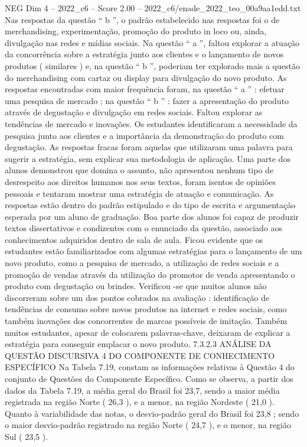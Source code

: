 \begin{textsample}{NEG Dim 4 – 2022\_c6 – Score 2.00 – 2022\_c6/enade\_2022\_teo\_00a9aa1edd.txt}
Nas respostas da questão “ b ”, o padrão estabelecido nas respostas foi o de merchandising, experimentação, promoção do produto in loco ou, ainda, divulgação nas redes e mídias sociais.
Na questão “ a ”, faltou explorar a atuação da concorrência sobre a estratégia junto aos clientes e o lançamento de novos produtos ( similares ) e, na questão “ b ”, poderiam ter explorado mais a questão do merchandising com cartaz ou display para divulgação do novo produto.
As respostas encontradas com maior frequência foram, na questão “ a ” : efetuar uma pesquisa de mercado ; na questão “ b ” : fazer a apresentação do produto através de degustação e divulgação em redes sociais.
Faltou explorar as tendências de mercado e inovações.
Os estudantes identificaram a necessidade da pesquisa junto aos clientes e a importância da demonstração do produto com degustação.
As respostas fracas foram aquelas que utilizaram uma palavra para sugerir a estratégia, sem explicar sua metodologia de aplicação.
Uma parte dos alunos demonstrou que domina o assunto, não apresentou nenhum tipo de desrespeito aos direitos humanos nos seus textos, foram isentos de opiniões pessoais e tentaram mostrar uma estratégia de atuação e comunicação.
As respostas estão dentro do padrão estipulado e do tipo de escrita e argumentação esperada por um aluno de graduação.
Boa parte dos alunos foi capaz de produzir textos dissertativos e condizentes com o enunciado da questão, associado aos conhecimentos adquiridos dentro de sala de aula.
Ficou evidente que os estudantes estão familiarizados com algumas estratégias para o lançamento de um novo produto, como a pesquisa de mercado, a utilização de redes sociais e a promoção de vendas através da utilização do promotor de venda apresentando o produto com degustação ou brindes.
Verificou -se que muitos alunos não discorreram sobre um dos pontos cobrados na avaliação : identificação de tendências de consumo sobre novos produtos na internet e redes sociais, como também inovações dos concorrentes de marcas possíveis de imitação.
Também muitos estudantes, apesar de colocarem palavras-chave, deixaram de explicar a estratégia para conseguir emplacar o novo produto. 7.3.2.3 ANÁLISE DA QUESTÃO DISCURSIVA 4 DO COMPONENTE DE CONHECIMENTO ESPECÍFICO Na Tabela 7.19, constam as informações relativas à Questão 4 do conjunto de Questões do Componente Específico.
Como se observa, a partir dos dados da Tabela 7.19, a média geral do Brasil foi 23,7, sendo a maior média registrada na região Norte ( 26,3 ), e a menor, na região Nordeste ( 21,0 ).
Quanto à variabilidade das notas, o desvio-padrão geral do Brasil foi 23,8 ; sendo o maior desvio-padrão registrado na região Norte ( 24,7 ), e o menor, na região Sul ( 23,5 ).

\end{textsample}
